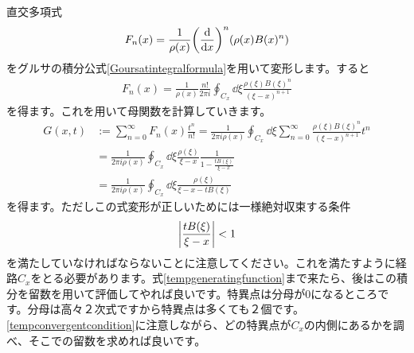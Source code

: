 \documentclass[report,paper=a4, fontsize=12pt, line_length=16cm, number_of_lines=33,dvipdfmx]{jlreq}
\numberwithin{equation}{section}
\begin{document}
直交多項式
\begin{align}
  F_n(x)=
  \frac{1}{\rho(x)}\qty(\dv{x})^n(\rho(x)B(x)^n)
\end{align}
をグルサの積分公式\eqref{Goursatintegralformula}を用いて変形します。すると
\begin{align}
  F_n(x)=\frac{1}{\rho(x)}\frac{n!}{2\pi i}\oint_{C_x}\dd{\xi} \frac{\rho(\xi)B(\xi)^n}{(\xi-x)^{n+1}}
\end{align}
を得ます。これを用いて母関数を計算していきます。
\begin{align}
  G(x,t)&:=\sum_{n=0}^{\infty}F_n(x)\frac{t^n}{n!}
  =\frac{1}{2\pi i \rho(x)}\oint_{C_x}\dd{\xi}\sum_{n=0}^{\infty}\frac{\rho(\xi)B(\xi)^n}{(\xi-x)^{n+1}}t^n\nonumber\\
  &=\frac{1}{2\pi i \rho(x)}\oint_{C_x}\dd{\xi}\frac{\rho(\xi)}{\xi-x}\frac{1}{1-\frac{tB(\xi)}{\xi-x}}\nonumber\\
  &=\frac{1}{2\pi i \rho(x)}\oint_{C_x}\dd{\xi}\frac{\rho(\xi)}{\xi-x-tB(\xi)}\label{tempgeneratingfunction}
\end{align}
を得ます。ただしこの式変形が正しいためには一様絶対収束する条件
\begin{align}
  \qty|\frac{tB(\xi)}{\xi-x}|<1\label{tempconvergentcondition}
\end{align}
を満たしていなければならないことに注意してください。これを満たすように経路$C_x$をとる必要があります。式\eqref{tempgeneratingfunction}まで来たら、後はこの積分を留数を用いて評価してやれば良いです。特異点は分母が$0$になるところです。分母は高々２次式ですから特異点は多くても２個です。\eqref{tempconvergentcondition}に注意しながら、どの特異点が$C_x$の内側にあるかを調べ、そこでの留数を求めれば良いです。
\end{document}
